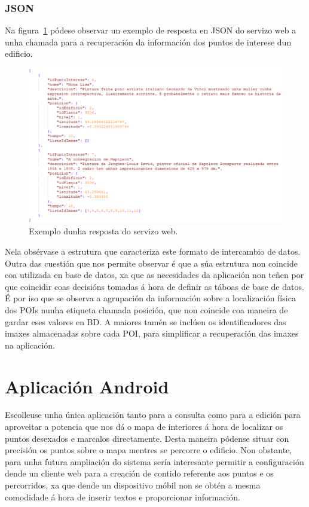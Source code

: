 \subsubsection{JSON}
Na figura~\ref{fig:json} pódese observar un exemplo de resposta en JSON do servizo web a unha chamada para a recuperación da información dos puntos de interese dun edificio.

\begin{figure}[tbh] 
	\begin{center}
		\includegraphics[width=1\textwidth]{figures/codigo/json}
		\caption{Exemplo dunha resposta do servizo web.}
		\label{fig:json}
	\end{center}
\end{figure}

Nela obsérvase a estrutura que caracteriza este formato de intercambio de datos. Outra das cuestión que nos permite observar é que a súa estrutura non coincide coa utilizada en base de datos, xa que as necesidades da aplicación non teñen por que coincidir coas decisións tomadas á hora de definir as táboas de base de datos. É por iso que se observa a agrupación da información sobre a localización física dos POIs nunha etiqueta chamada posición, que non coincide coa maneira de gardar eses valores en BD. A maiores tamén se inclúen os identificadores das imaxes almacenadas sobre cada POI, para simplificar a recuperación das imaxes na aplicación.

\section{Aplicación Android}
Escolleuse unha única aplicación tanto para a consulta como para a edición para aproveitar a potencia que nos dá o mapa de interiores á hora de localizar os puntos desexados e marcalos directamente. Desta maneira pódense situar con precisión os puntos sobre o mapa mentres se percorre o edificio. Non obstante, para unha futura ampliación do sistema sería interesante permitir a configuración dende un cliente web para a creación de contido referente aos puntos e os percorridos, xa que dende un dispositivo móbil non se obtén a mesma comodidade á hora de inserir textos e proporcionar información.


